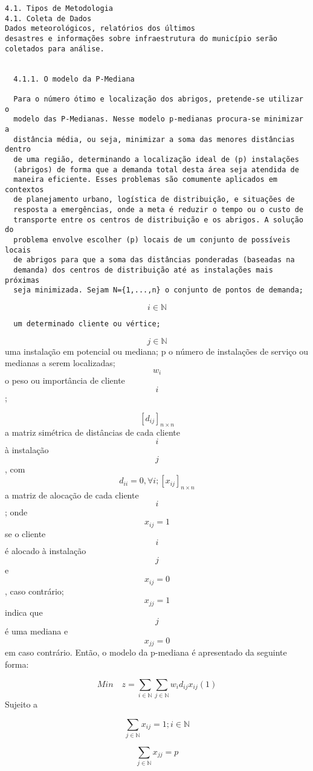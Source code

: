 \documentclass[
]{article}
\begin{document}
\begin{verbatim}
4.1. Tipos de Metodologia
4.1. Coleta de Dados
Dados meteorológicos, relatórios dos últimos
desastres e informações sobre infraestrutura do município serão
coletados para análise.


  4.1.1. O modelo da P-Mediana

  Para o número ótimo e localização dos abrigos, pretende-se utilizar o
  modelo das P-Medianas. Nesse modelo p-medianas procura-se minimizar a
  distância média, ou seja, minimizar a soma das menores distâncias dentro
  de uma região, determinando a localização ideal de (p) instalações
  (abrigos) de forma que a demanda total desta área seja atendida de
  maneira eficiente. Esses problemas são comumente aplicados em contextos
  de planejamento urbano, logística de distribuição, e situações de
  resposta a emergências, onde a meta é reduzir o tempo ou o custo de
  transporte entre os centros de distribuição e os abrigos. A solução do
  problema envolve escolher (p) locais de um conjunto de possíveis locais
  de abrigos para que a soma das distâncias ponderadas (baseadas na
  demanda) dos centros de distribuição até as instalações mais próximas
  seja minimizada. Sejam N={1,...,n} o conjunto de pontos de demanda;
\end{verbatim}

\[
i \in \mathbb{N}
\]

\begin{verbatim}
  um determinado cliente ou vértice; 
\end{verbatim}

\[
j \in \mathbb{N}
\] uma instalação em potencial ou mediana; p o número de instalações de
serviço ou medianas a serem localizadas; \[
w_i
\] o peso ou importância de cliente \[
i
\];

\[
[d_{ij}]_{n \times n}
\] a matriz simétrica de distâncias de cada cliente \[i\] à instalação
\[
j
\] , com \[
d_{ii}=0, \forall i; [x_{ij}]_{n \times n} 
\] a matriz de alocação de cada cliente \[i\]; onde \[
x_{ij}=1
\] se o cliente \[
i
\] é alocado à instalação \[
j
\] e \[
x_{ij}=0
\] , caso contrário; \[
x_{jj}=1
\] indica que \[
j
\] é uma mediana e \[
x_{jj}=0
\] em caso contrário. Então, o modelo da p-mediana é apresentado da
seguinte forma:

\[
Min \quad  z=\sum_{i \in \mathbb{N}} \sum_{j \in \mathbb{N}} w_{i}d_{ij}x_{ij}    (1)
\] Sujeito a

\[
\sum_{j \in \mathbb{N}}x_{ij}=1; i \in \mathbb{N}
\]

\[
\sum_{j \in \mathbb{N}}x_{jj}=p
\]
\end{document}
